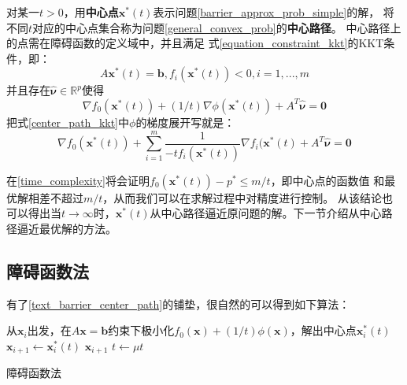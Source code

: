 \documentclass{article}
\begin{document}
对某一$t>0$，用\textbf{中心点}$\bm x^*(t)$表示问题\ref{barrier_approx_prob_simple}的解，
将不同$t$对应的中心点集合称为问题\ref{general_convex_prob}的\textbf{中心路径}。
中心路径上的点需在障碍函数的定义域中，并且满足
式\eqref{equation_constraint_kkt}的KKT条件，即：
$$A\bm x^*(t)=\bm b,f_i(\bm x^*(t))<0,i=1,...,m$$
并且存在$\widehat{\bm \nu}\in \mathbb{R}^p$使得
\begin{equation}\nabla f_0(\bm x^*(t))+(1/t)\nabla\phi(\bm x^*(t))+A^T\widehat{\bm \nu}=\bm 0\label{center_path_kkt}\end{equation}
把式\eqref{center_path_kkt}中$\phi$的梯度展开写就是：
\begin{equation}
    \nabla f_0(\bm x^*(t))+\sum_{i=1}^m{\frac{1}{-tf_i(\bm x^*(t))}\nabla f_i(\bm x^*(t)}+A^T\widehat{\bm \nu}=\bm 0\label{center_path_kkt_2}
\end{equation}

在\ref{time_complexity}将会证明$f_0(\bm x^*(t))-p^*\le m/t$，即中心点的函数值
和最优解相差不超过$m/t$，从而我们可以在求解过程中对精度进行控制。
从该结论也可以得出当$t\rightarrow\infty$时，$\bm x^*(t)$从中心路径逼近原问题的解。下一节介绍从中心路径逼近最优解的方法。
\label{text_barrier_center_path}
\subsection{障碍函数法}
\label{text_barrier_method}
有了\ref{text_barrier_center_path}的铺垫，很自然的可以得到如下算法：

\renewcommand{\algorithmcfname}{算法}
\begin{algorithm}[H]
     {
        从$\bm x_i$出发，在$A\bm x=\bm b$约束下极小化$f_0(\bm x)+(1/t)\phi(\bm x)$，解出中心点$\bm x_i^*(t)$\;
        $\bm x_{i+1}\leftarrow\bm x_i^*(t)$\;
         {
            \Return $\bm x_{i+1}$
        }
        $t\leftarrow \mu t$
    }
    \caption{障碍函数法}
    \label{barrier_method}
\end{algorithm}
\end{document}
